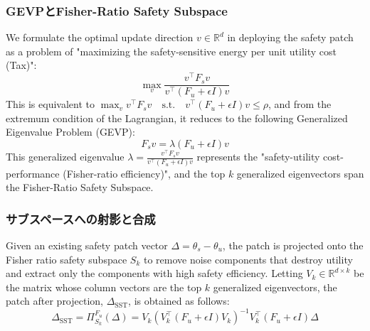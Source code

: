 \documentclass{article}
\begin{document}
\subsubsection{GEVPとFisher-Ratio Safety Subspace}

We formulate the optimal update direction $v \in \mathbb{R}^d$ in deploying the safety patch as a problem of "maximizing the safety-sensitive energy per unit utility cost (Tax)":
\[ \max_v \frac{v^\top F_s v}{v^\top (F_u + \epsilon I) v} \]
This is equivalent to $\max_v v^\top F_s v \quad \text{s.t.} \quad v^\top (F_u + \epsilon I) v \le \rho$, and from the extremum condition of the Lagrangian, it reduces to the following Generalized Eigenvalue Problem (GEVP):
\[ F_s v = \lambda (F_u + \epsilon I) v \]
This generalized eigenvalue $\lambda = \frac{v^\top F_s v}{v^\top (F_u + \epsilon I) v}$ represents the "safety-utility cost-performance (Fisher-ratio efficiency)", and the top $k$ generalized eigenvectors span the Fisher-Ratio Safety Subspace.

\subsubsection{サブスペースへの射影と合成}

Given an existing safety patch vector $\Delta = \theta_s - \theta_u$, the patch is projected onto the Fisher ratio safety subspace $S_k$ to remove noise components that destroy utility and extract only the components with high safety efficiency. Letting $V_k \in \mathbb{R}^{d \times k}$ be the matrix whose column vectors are the top $k$ generalized eigenvectors, the patch after projection, $\Delta_{\text{SST}}$, is obtained as follows:
\[ \Delta_{\text{SST}} = \Pi_{S_k}^{F_u} (\Delta) = V_k (V_k^\top (F_u + \epsilon I) V_k)^{-1} V_k^\top (F_u + \epsilon I) \Delta \]
\end{document}
